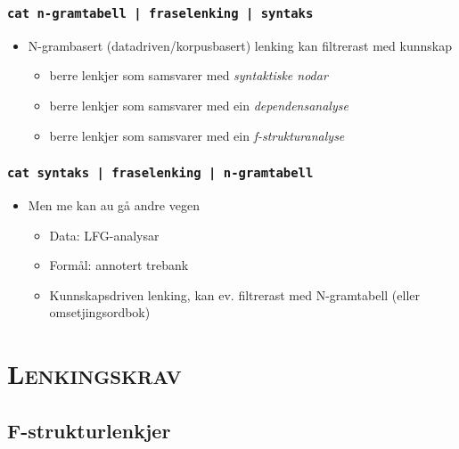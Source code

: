 \documentclass[xcolor=x11names,compress,bigger]{beamer}
\renewcommand{\(}{\begin{columns}}
\renewcommand{\)}{\end{columns}}
\newcommand{\<}[1]{\begin{column}{#1}}
\renewcommand{\>}{\end{column}}
\begin{document}
\begin{frame}\frametitle{\texttt{\normalsize cat n-gramtabell | fraselenking | syntaks}}
    \begin{itemize}
    \item N-grambasert (datadriven/korpusbasert) lenking kan filtrerast med kunnskap
      \begin{itemize}
       \item berre lenkjer som samsvarer med \emph{syntaktiske nodar} \citep{samuelsson2007apa}
       \item berre lenkjer som samsvarer med ein \emph{dependensanalyse} \citep{hearne2008ccd}
       \item berre lenkjer som samsvarer med ein \emph{f-strukturanalyse} \citep{graham2009osr}
      \end{itemize}
    \end{itemize}
  \end{frame}

\begin{frame}\frametitle{\texttt{\normalsize cat syntaks | fraselenking | n-gramtabell}}
  \begin{itemize}
  \item Men me kan au gå andre vegen
    \begin{itemize}
    \item Data: LFG-analysar
    \item Formål: annotert trebank
    \item Kunnskapsdriven lenking, kan ev. filtrerast med N-gramtabell
      (eller omsetjingsordbok)
    \end{itemize}
  \end{itemize}
\end{frame}

\section{\scshape Lenkingskrav}
\subsection{F-strukturlenkjer}
\end{document}
